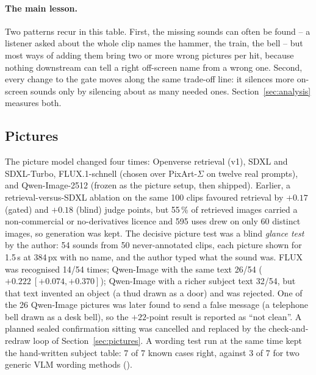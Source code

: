 \paragraph{The main lesson.} Two patterns recur in this table. First, the missing sounds can often be found -- a
listener asked about the whole clip names the hammer, the train, the bell -- but most ways of adding them bring two
or more wrong pictures per hit, because nothing downstream can tell a right off-screen name from a wrong one. Second,
every change to the gate moves along the same trade-off line: it silences more on-screen sounds only by silencing
about as many needed ones. Section~\ref{sec:analysis} measures both.

\subsection{Pictures}\label{sec:pic-history}
The picture model changed four times: Openverse retrieval (v1), SDXL and SDXL-Turbo, FLUX.1-schnell (chosen over
PixArt-$\Sigma$ on twelve real prompts), and Qwen-Image-2512 (frozen as the picture setup, then shipped). Earlier, a
retrieval-versus-SDXL ablation on the same 100 clips favoured retrieval by $+0.17$ (gated) and $+0.18$ (blind) judge
points, but 55\,\% of retrieved images carried a non-commercial or no-derivatives licence and 595 uses drew on only 60
distinct images, so generation was kept. The decisive picture test was a blind \emph{glance test} by the author:
54 sounds from 50 never-annotated clips, each picture shown for 1.5\,s at 384\,px with no name, and the author
typed what the sound was. FLUX was recognised 14/54 times; Qwen-Image with the same text 26/54
($+0.222\ [+0.074, +0.370]$); Qwen-Image with a richer subject text 32/54, but that text invented an object (a thud
drawn as a door) and was rejected. One of the 26 Qwen-Image pictures was later found to send a false message (a
telephone bell drawn as a desk bell), so the $+22$-point result is reported as ``not clean''. A planned sealed
confirmation sitting was cancelled and replaced by the check-and-redraw loop of Section~\ref{sec:pictures}.
A wording test run at the same time kept the hand-written subject table: 7 of 7 known cases right, against 3 of 7 for two
generic VLM wording methods ().

